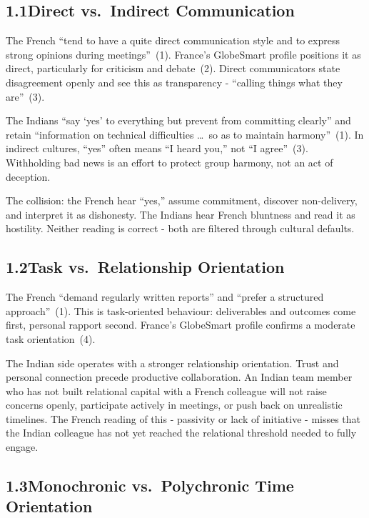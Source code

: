 \documentclass[12pt, a4paper]{article}
\begin{document}
\subsection*{1.1\quad Direct vs.\ Indirect Communication}

The French ``tend to have a quite direct communication style and to express strong opinions during meetings''~(1). France's GlobeSmart profile positions it as direct, particularly for criticism and debate~(2). Direct communicators state disagreement openly and see this as transparency - ``calling things what they are''~(3).

The Indians ``say `yes' to everything but prevent from committing clearly'' and retain ``information on technical difficulties \ldots\ so as to maintain harmony''~(1). In indirect cultures, ``yes'' often means ``I heard you,'' not ``I agree''~(3). Withholding bad news is an effort to protect group harmony, not an act of deception.

The collision: the French hear ``yes,'' assume commitment, discover non-delivery, and interpret it as dishonesty. The Indians hear French bluntness and read it as hostility. Neither reading is correct - both are filtered through cultural defaults.

\subsection*{1.2\quad Task vs.\ Relationship Orientation}

The French ``demand regularly written reports'' and ``prefer a structured approach''~(1). This is task-oriented behaviour: deliverables and outcomes come first, personal rapport second. France's GlobeSmart profile confirms a moderate task orientation~(4).

The Indian side operates with a stronger relationship orientation. Trust and personal connection precede productive collaboration. An Indian team member who has not built relational capital with a French colleague will not raise concerns openly, participate actively in meetings, or push back on unrealistic timelines. The French reading of this - passivity or lack of initiative - misses that the Indian colleague has not yet reached the relational threshold needed to fully engage.

\subsection*{1.3\quad Monochronic vs.\ Polychronic Time Orientation}
\end{document}
